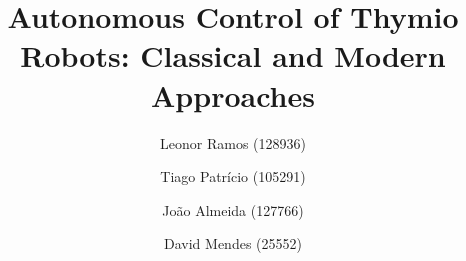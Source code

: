 \title{\textbf{Autonomous Control of Thymio Robots: Classical and Modern Approaches}}

\author[first]{Leonor Ramos (128936)}
\author[second]{Tiago Patrício (105291)}
\author[third]{João Almeida (127766)}
\author[fourth]{David Mendes (25552)}
